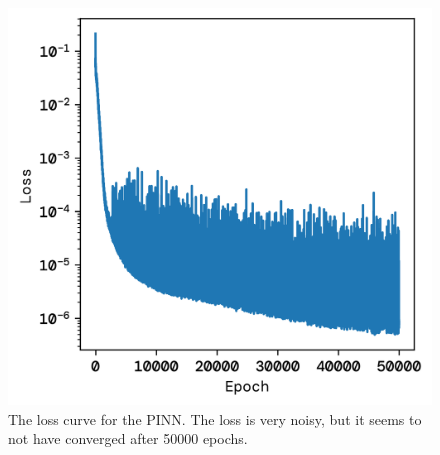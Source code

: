 \documentclass[twoside,11pt]{report}
\begin{document}
\begin{figure}[!ht]
\begin{minipage}[t]{0.5\textwidth - 1mm}
\begin{center}
                \includegraphics[width=\textwidth]{../runsAndFigures/wave_tf_pinn_loss.png}
            \end{center}
            \caption
            {
                The loss curve for the PINN. The loss is very noisy, but it seems to not have converged after 50000 epochs.
            }\label{fig:wave_tf_dnn}
        \end{minipage}
    \end{figure}
\end{document}
